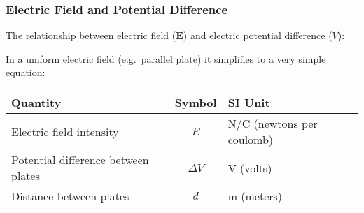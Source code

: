 \documentclass[12pt,aspectratio=169]{beamer}
\newcommand{\mb}[1]{\mathbf{#1}}
\newcommand{\eq}[2]{\vspace{#1}{\Large\begin{displaymath}#2\end{displaymath}}}
\begin{document}
\begin{frame}
  \frametitle{Electric Field and Potential Difference}
  
  The relationship between electric field ($\mb{E}$) and electric potential
  difference ($V$):
    
  \eq{-.15in}{
    \mb{E}=-\frac{\partial V}{\partial r}
  }

  In a uniform electric field (e.g.\ parallel plate) it simplifies to a very
  simple equation:

  \eq{-.2in}{
    \boxed{E=\frac{\Delta V}{d}}
  }

  \vspace{-.1in}
  \begin{center}
    \begin{tabular}{l|c|l}
      \rowcolor{pink}
      \textbf{Quantity} & \textbf{Symbol} & \textbf{SI Unit} \\ \hline
      Electric field intensity & $E$ & \si{N/C} (newtons per coulomb) \\
      Potential difference between plates & $\Delta V$ & \si{V} (volts) \\
      Distance between plates       & $d$ & \si{m} (meters)\\
    \end{tabular}
  \end{center}
\end{frame}
\end{document}
